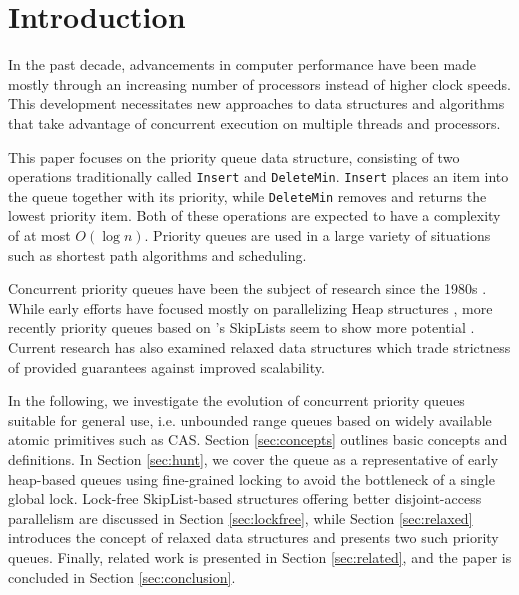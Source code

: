 \chapter{Introduction} \label{ch:introduction}


In the past decade, advancements in computer performance have been made mostly
through an increasing number of processors instead of higher clock speeds.
This development necessitates new approaches to data structures and algorithms
that take advantage of concurrent execution on multiple threads and processors.


This paper focuses on the priority queue data structure, consisting of two operations
traditionally called \lstinline|Insert| and \lstinline|DeleteMin|. \lstinline|Insert|
places an item into the queue together with its priority, while \lstinline|DeleteMin|
removes and returns the lowest priority item. Both of these operations are expected to have
a complexity of at most $O(\log n)$. Priority queues are used in a large variety
of situations such as shortest path algorithms and scheduling. %


Concurrent priority queues have been the subject of research since the 1980s
\cite{ayani1990lr,biswas1987simultaneous,das1996distributed,deo1992parallel,huang1991evaluation,
luchetti1993some,mans1998portable,olariu1991optimal,prasad1995parallel}.
While early efforts have focused mostly on parallelizing Heap structures
\cite{hunt1996efficient},
more recently priority queues based on \citeauthor{pugh1990skip}'s SkipLists
\cite{pugh1990skip} seem to show more potential \cite{shavit2000skiplist,
sundell2003fast,herlihy2012art,linden2013skiplist}. Current research has also examined
relaxed data structures \cite{wimmer2013data,alistarhspraylist} which trade
strictness of provided guarantees against improved scalability.


In the following, we investigate the evolution of concurrent priority queues suitable for general use,
i.e. unbounded range queues based on widely available atomic primitives such as \ac{CAS}.
Section \ref{sec:concepts} outlines basic concepts and definitions. In Section \ref{sec:hunt},
we cover the \citeauthor{hunt1996efficient} queue as a representative of early heap-based queues using
fine-grained locking to avoid the bottleneck of a single global lock. Lock-free SkipList-based
structures offering better disjoint-access parallelism are discussed in Section \ref{sec:lockfree},
while Section \ref{sec:relaxed} introduces the concept of relaxed data structures and presents two
such priority queues. Finally, related work is presented in Section \ref{sec:related}, and the paper is
concluded in Section \ref{sec:conclusion}.
